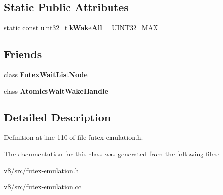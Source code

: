 \subsection*{Static Public Attributes}
\begin{DoxyCompactItemize}
\item 
\mbox{\label{classv8_1_1internal_1_1FutexEmulation_a44e18f878cf35172c8b7e186aa6732cb}} 
static const \mbox{\hyperlink{classuint32__t}{uint32\+\_\+t}} {\bfseries k\+Wake\+All} = U\+I\+N\+T32\+\_\+\+M\+AX
\end{DoxyCompactItemize}
\subsection*{Friends}
\begin{DoxyCompactItemize}
\item 
\mbox{\label{classv8_1_1internal_1_1FutexEmulation_a468b1954483b12644e4ac971b41740f2}} 
class {\bfseries Futex\+Wait\+List\+Node}
\item 
\mbox{\label{classv8_1_1internal_1_1FutexEmulation_a03178b4ef32a1c9f950260c0a07b7cef}} 
class {\bfseries Atomics\+Wait\+Wake\+Handle}
\end{DoxyCompactItemize}


\subsection{Detailed Description}


Definition at line 110 of file futex-\/emulation.\+h.



The documentation for this class was generated from the following files\+:\begin{DoxyCompactItemize}
\item 
v8/src/futex-\/emulation.\+h\item 
v8/src/futex-\/emulation.\+cc\end{DoxyCompactItemize}
